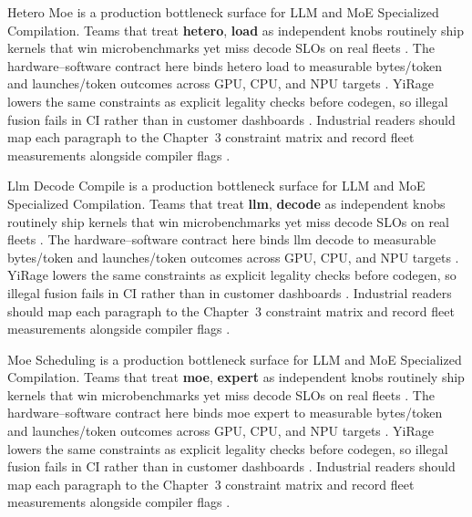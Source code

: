 Hetero Moe is a production bottleneck surface for LLM and MoE Specialized Compilation. Teams that treat \textbf{hetero}, \textbf{load} as independent knobs routinely ship kernels that win microbenchmarks yet miss decode SLOs on real fleets \citep{nvidia2022hopper,amd2024aie}. The hardware--software contract here binds hetero load to measurable bytes/token and launches/token outcomes across GPU, CPU, and NPU targets \citep{semianalysis2024tma,dlbook}. YiRage lowers the same constraints as explicit legality checks before codegen, so illegal fusion fails in CI rather than in customer dashboards \citep{amd2024xdna,dao2022flashattention}. Industrial readers should map each paragraph to the Chapter~3 constraint matrix and record fleet measurements alongside compiler flags \citep{amd2024aie,kwon2023vllm}.

Llm Decode Compile is a production bottleneck surface for LLM and MoE Specialized Compilation. Teams that treat \textbf{llm}, \textbf{decode} as independent knobs routinely ship kernels that win microbenchmarks yet miss decode SLOs on real fleets \citep{taxbreak2026,semianalysis2024tma}. The hardware--software contract here binds llm decode to measurable bytes/token and launches/token outcomes across GPU, CPU, and NPU targets \citep{memoryfloor2026,amd2024xdna}. YiRage lowers the same constraints as explicit legality checks before codegen, so illegal fusion fails in CI rather than in customer dashboards \citep{nvidia2022hopper,amd2024aie}. Industrial readers should map each paragraph to the Chapter~3 constraint matrix and record fleet measurements alongside compiler flags \citep{semianalysis2024tma,dlbook}.

Moe Scheduling is a production bottleneck surface for LLM and MoE Specialized Compilation. Teams that treat \textbf{moe}, \textbf{expert} as independent knobs routinely ship kernels that win microbenchmarks yet miss decode SLOs on real fleets \citep{memoryfloor2026,amd2024xdna}. The hardware--software contract here binds moe expert to measurable bytes/token and launches/token outcomes across GPU, CPU, and NPU targets \citep{nvidia2022hopper,amd2024aie}. YiRage lowers the same constraints as explicit legality checks before codegen, so illegal fusion fails in CI rather than in customer dashboards \citep{semianalysis2024tma,dlbook}. Industrial readers should map each paragraph to the Chapter~3 constraint matrix and record fleet measurements alongside compiler flags \citep{amd2024xdna,dao2022flashattention}.


